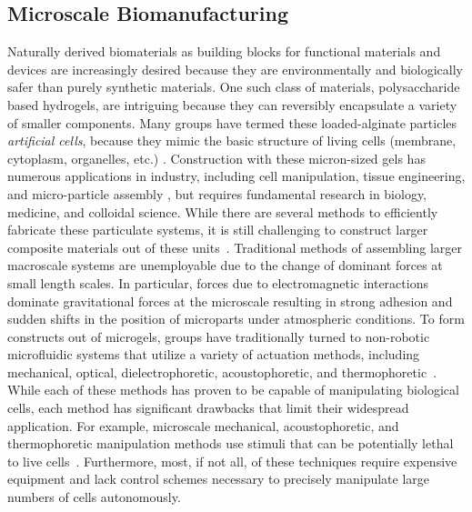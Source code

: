 \subsection{Microscale Biomanufacturing}
Naturally derived biomaterials as building blocks for functional materials and devices are increasingly desired because they are environmentally and biologically safer than purely synthetic materials. 
One such class of materials, polysaccharide based hydrogels, are intriguing because they can reversibly encapsulate a variety of smaller components. Many groups have termed these loaded-alginate particles  \emph{artificial cells}, because they mimic the basic structure of living cells (membrane, cytoplasm, organelles, etc.) \cite{chang2005therapeutic,prakash2007artificial,chang2007artificial}. 
Construction with these micron-sized gels has numerous applications in industry, including cell manipulation, tissue engineering, and micro-particle assembly \cite{weibel2007microfabrication,abbott2007robotics,yi2006microfluidics,castillo2009manipulation,sitti2015biomedical}, but requires fundamental research in biology, medicine, and colloidal science. 
While there are several methods to efficiently fabricate these particulate systems, it is still challenging to construct larger composite materials out of these units~\cite{assal2015highlights}. Traditional methods of assembling larger macroscale systems are unemployable due to the change of dominant forces at small length scales. 
In particular, forces due to electromagnetic interactions dominate gravitational forces at the microscale resulting in strong adhesion and sudden shifts in the position of microparts under atmospheric conditions. 
To form constructs out of microgels, groups have traditionally turned to non-robotic microfluidic systems that utilize a variety of actuation methods, including mechanical, optical, dielectrophoretic, acoustophoretic, and thermophoretic~\cite{desai2007engineering, chiou2005massively,shields2015microfluidic,augustsson2009decomplexing,vigolo2010thermophoresis}. 
While each of these methods has proven to be capable of manipulating biological cells, each method has significant drawbacks that limit their widespread application. 
For example, microscale mechanical, acoustophoretic, and thermophoretic manipulation methods use stimuli that can be potentially lethal to live cells~\cite{lin2012application}. 
Furthermore, most, if not all, of these techniques require expensive equipment and lack control schemes necessary to precisely manipulate large numbers of cells autonomously.

